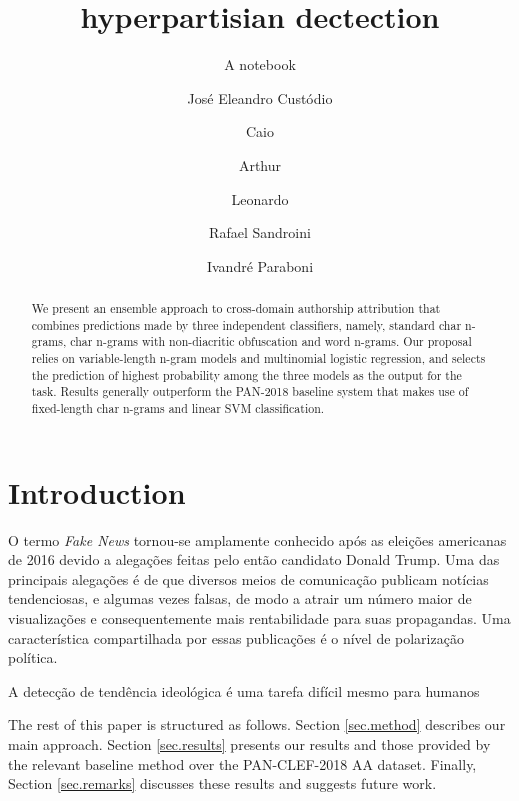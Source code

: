 \documentclass{llncs}
\begin{document}
	
	\title{hyperpartisian dectection}
	\subtitle{A notebook}
	
	\author{Jos\'e Eleandro Cust\'odio
		\and Caio
		\and Arthur
		\and Leonardo
		\and Rafael Sandroini
		\and Ivandr\'e Paraboni}
	
	\maketitle
	
	\begin{abstract}
		We present an ensemble approach to cross-domain authorship attribution that combines predictions made by three independent classifiers, namely, standard char n-grams, char n-grams with non-diacritic obfuscation and word n-grams. Our proposal relies on variable-length n-gram models and multinomial logistic regression, and selects the prediction of highest probability among the three models as the output for the task. Results generally outperform the PAN-2018 baseline system that makes use of fixed-length char n-grams and linear SVM classification.
	\end{abstract}
	
	
	
	\section{Introduction}
	\label{sec.intro}
	
	
	O termo {\it Fake News} tornou-se amplamente conhecido após as eleições americanas de 2016 devido a alegações feitas pelo então candidato Donald Trump. Uma das principais alegações é de que diversos meios de comunicação publicam notícias tendenciosas, e algumas vezes falsas, de modo a atrair um número maior de visualizações e consequentemente mais rentabilidade para suas propagandas. Uma característica compartilhada por essas publicações é o nível de polarização política.
	
	A detecção de tendência ideológica é uma tarefa difícil mesmo para humanos \cite{Fallis2013}
	
	
	
	
	The rest of this paper is structured as follows. Section \ref{sec.method} describes our main approach. Section \ref{sec.results} presents our results and those provided by the relevant baseline method over the PAN-CLEF-2018 AA dataset. Finally, Section \ref{sec.remarks} discusses these results and suggests future work.
	
\end{document}
